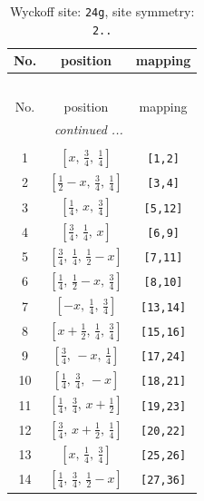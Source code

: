 \documentclass[fleqn,8pt]{jsarticle}
\begin{document}
\renewcommand{\arraystretch}{1.2}
\begin{longtable}{ccc}
\caption{Wyckoff site: {\tt 24g}, site symmetry: {\tt 2..}}
 \\
 \hline \hline
No. & position & mapping \\ \hline \endfirsthead

\multicolumn{2}{l}{\tablename\ \thetable{}} \\
 \hline \hline
No. & position & mapping \\ \hline \endhead

 \hline \hline
\multicolumn{2}{r}{\footnotesize\it continued ...} \\ \endfoot

 \hline \hline
\multicolumn{2}{r}{} \\ \endlastfoot

1 & $\left[ x,\, \frac{3}{4},\, \frac{1}{4} \right]$ & {\tt [1,2]} \\ \hline
2 & $\left[ \frac{1}{2} - x,\, \frac{3}{4},\, \frac{1}{4} \right]$ & {\tt [3,4]} \\ \hline
3 & $\left[ \frac{1}{4},\, x,\, \frac{3}{4} \right]$ & {\tt [5,12]} \\ \hline
4 & $\left[ \frac{3}{4},\, \frac{1}{4},\, x \right]$ & {\tt [6,9]} \\ \hline
5 & $\left[ \frac{3}{4},\, \frac{1}{4},\, \frac{1}{2} - x \right]$ & {\tt [7,11]} \\ \hline
6 & $\left[ \frac{1}{4},\, \frac{1}{2} - x,\, \frac{3}{4} \right]$ & {\tt [8,10]} \\ \hline
7 & $\left[ - x,\, \frac{1}{4},\, \frac{3}{4} \right]$ & {\tt [13,14]} \\ \hline
8 & $\left[ x + \frac{1}{2},\, \frac{1}{4},\, \frac{3}{4} \right]$ & {\tt [15,16]} \\ \hline
9 & $\left[ \frac{3}{4},\, - x,\, \frac{1}{4} \right]$ & {\tt [17,24]} \\ \hline
10 & $\left[ \frac{1}{4},\, \frac{3}{4},\, - x \right]$ & {\tt [18,21]} \\ \hline
11 & $\left[ \frac{1}{4},\, \frac{3}{4},\, x + \frac{1}{2} \right]$ & {\tt [19,23]} \\ \hline
12 & $\left[ \frac{3}{4},\, x + \frac{1}{2},\, \frac{1}{4} \right]$ & {\tt [20,22]} \\ \hline
13 & $\left[ x,\, \frac{1}{4},\, \frac{3}{4} \right]$ & {\tt [25,26]} \\ \hline
14 & $\left[ \frac{1}{4},\, \frac{3}{4},\, \frac{1}{2} - x \right]$ & {\tt [27,36]} \\ \hline

\end{longtable}
\end{document}
